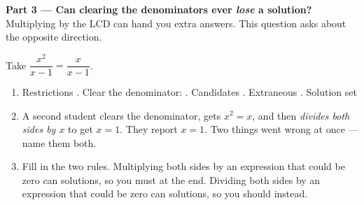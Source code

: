 \documentclass[10pt]{article}
\begin{document}
\begin{tcolorbox}[colback=white, colframe=black!40, title=\textbf{Tier E --- Extension},
    fonttitle=\bfseries, arc=1.5mm, left=3mm, right=3mm, top=2mm, bottom=2mm, breakable]
\vspace{5pt}
\textbf{Part 3 --- Can clearing the denominators ever \emph{lose} a solution?} Multiplying by the LCD
can hand you extra answers. This question asks about the opposite direction.

\vspace{2pt}
Take $\dfrac{x^2}{x-1}=\dfrac{x}{x-1}$.
\begin{enumerate}[label=(\alph*), leftmargin=2.1em, itemsep=5pt]
  \item Restrictions \blank{1.4cm}. Clear the denominator: \; \blank{2.0cm}. \; Candidates
        \blank{2.2cm}. \; Extraneous \blank{1.2cm}. \; Solution set \blank{1.6cm}
  \item A second student clears the denominator, gets $x^2=x$, and then \emph{divides both sides by
        $x$} to get $x=1$. They report $x=1$. Two things went wrong at once --- name them both.
  \item Fill in the two rules. Multiplying both sides by an expression that could be zero can
        \blank{1.6cm} solutions, so you must \blank{1.6cm} at the end. Dividing both sides by an
        expression that could be zero can \blank{1.6cm} solutions, so you should
        \blank{2.6cm} instead.
\end{enumerate}
\end{tcolorbox}
\end{document}
